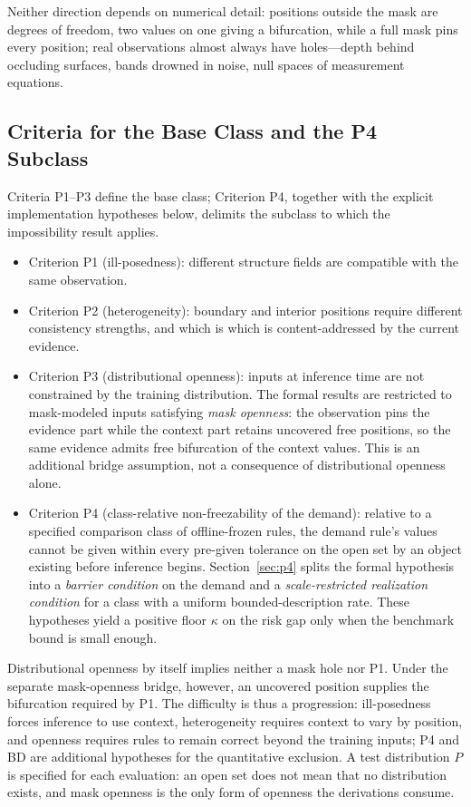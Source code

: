 \documentclass[twoside,11pt]{article}
\begin{document}
Neither direction depends on numerical detail: positions outside the mask are degrees of freedom, two values on one giving a bifurcation, while a full mask pins every position; real observations almost always have holes---depth behind occluding surfaces, bands drowned in noise, null spaces of measurement equations.

\subsection{Criteria for the Base Class and the P4 Subclass}

Criteria P1--P3 define the base class; Criterion P4, together with the explicit implementation hypotheses below, delimits the subclass to which the impossibility result applies.

\begin{itemize}
\item Criterion P1 (ill-posedness): different structure fields are compatible with the same observation.
\item Criterion P2 (heterogeneity): boundary and interior positions require different consistency strengths, and which is which is content-addressed by the current evidence.
\item Criterion P3 (distributional openness): inputs at inference time are not constrained by the training distribution. The formal results are restricted to mask-modeled inputs satisfying \emph{mask openness}: the observation pins the evidence part while the context part retains uncovered free positions, so the same evidence admits free bifurcation of the context values. This is an additional bridge assumption, not a consequence of distributional openness alone.
\item Criterion P4 (class-relative non-freezability of the demand): relative to a specified comparison class of offline-frozen rules, the demand rule's values cannot be given within every pre-given tolerance on the open set by an object existing before inference begins. Section~\ref{sec:p4} splits the formal hypothesis into a \emph{barrier condition} on the demand and a \emph{scale-restricted realization condition} for a class with a uniform bounded-description rate. These hypotheses yield a positive floor $\kappa$ on the risk gap only when the benchmark bound is small enough.
\end{itemize}

Distributional openness by itself implies neither a mask hole nor P1. Under the separate mask-openness bridge, however, an uncovered position supplies the bifurcation required by P1. The difficulty is thus a progression: ill-posedness forces inference to use context, heterogeneity requires context to vary by position, and openness requires rules to remain correct beyond the training inputs; P4 and BD are additional hypotheses for the quantitative exclusion. A test distribution $P$ is specified for each evaluation: an open set does not mean that no distribution exists, and mask openness is the only form of openness the derivations consume.
\end{document}
